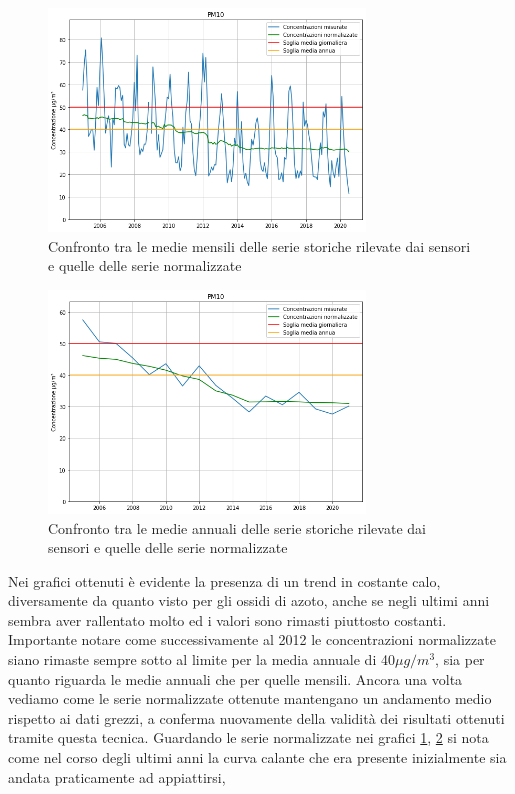 \documentclass[a4paper]{report}
\begin{document}
\begin{figure}[h]
\centering
\includegraphics[width=0.75\textwidth]{pm10_medie_mensili}
\caption{Confronto tra le medie mensili delle serie storiche rilevate dai sensori e quelle delle serie normalizzate}
\label{fig:pm10_medie_mensili}
\end{figure}

\begin{figure}[h]
\centering
\includegraphics[width=0.75\textwidth]{pm10_medie_annuali}
\caption{Confronto tra le medie annuali delle serie storiche rilevate dai sensori e quelle delle serie normalizzate}
\label{fig:pm10_medie_annuali}
\end{figure}

Nei grafici ottenuti è evidente la presenza di un trend in costante calo, diversamente da quanto visto per gli ossidi di azoto, anche se negli ultimi anni sembra aver rallentato molto ed i valori sono rimasti piuttosto costanti.
Importante notare come successivamente al 2012 le concentrazioni normalizzate siano rimaste sempre sotto al limite per la media annuale di 40$\mu g/m^3$, sia per quanto riguarda le medie annuali che per quelle mensili.
Ancora una volta vediamo come le serie normalizzate ottenute mantengano un andamento medio rispetto ai dati grezzi, a conferma nuovamente della validità dei risultati ottenuti tramite questa tecnica.
Guardando le serie normalizzate nei grafici \ref{fig:pm10_medie_mensili}, \ref{fig:pm10_medie_annuali} si nota come nel corso degli ultimi anni la curva calante che era presente inizialmente sia andata praticamente ad appiattirsi,
\end{document}
